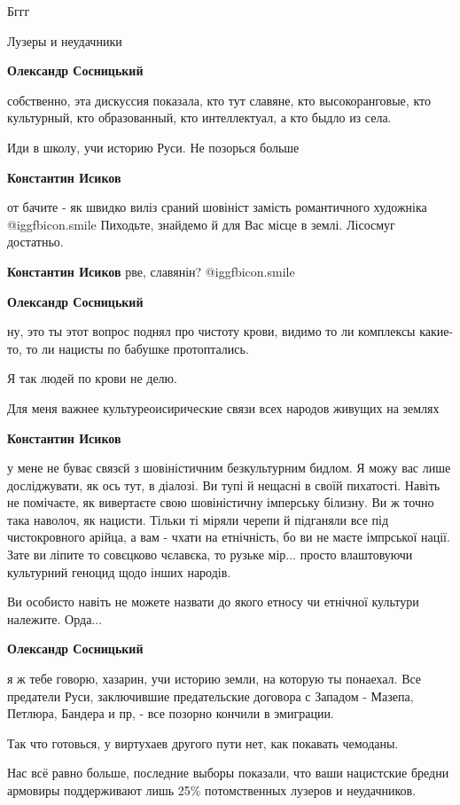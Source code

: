 \begin{itemize}
\begin{itemize}
Бггг

Лузеры и неудачники

\textbf{Олександр Сосницький} 

собственно, эта дискуссия показала, кто тут славяне, кто высокоранговые, кто
культурный, кто образованный, кто интеллектуал, а кто быдло из села.

Иди в школу, учи историю Руси.
Не позорься больше

\textbf{Константин Исиков} 

от бачите - як швидко виліз сраний шовініст замість романтичного художніка
@igg{fbicon.smile}  Пиходьте, знайдемо й для Вас місце в землі. Лісосмуг
достатньо.

\textbf{Константин Исиков} рве, славянін?  @igg{fbicon.smile} 

\textbf{Олександр Сосницький} 

ну, это ты этот вопрос поднял про чистоту крови, видимо то ли комплексы
какие-то, то ли нацисты по бабушке протоптались.

Я так людей по крови не делю.

Для меня важнее культуреоисирические связи всех народов живущих на землях

\textbf{Константин Исиков} 

у мене не буває связєй з шовіністичним безкультурним бидлом. Я можу вас лише
досліджувати, як ось тут, в діалозі. Ви тупі й нещасні в своїй пихатості.
Навіть не помічаєте, як вивертаєте свою шовіністичну імперську білизну. Ви ж
точно така наволоч, як нацисти. Тільки ті міряли черепи й підганяли все під
чистокровного арійца, а вам - чхати на етнічність, бо ви не маєте імпрської
нації. Зате ви ліпите то совєцково чєлавєка, то рузьке мір... просто влаштовуючи
культурний геноцид щодо інших народів.

Ви особисто навіть не можете назвати до якого етносу чи етнічної культури
належите. Орда...


\textbf{Олександр Сосницький} 

я ж тебе говорю, хазарин, учи историю земли, на которую ты понаехал. Все
предатели Руси, заключившие предательские договора с Западом - Мазепа, Петлюра,
Бандера и пр, - все позорно кончили в эмиграции.

Так что готовься, у виртухаев другого пути нет, как покавать чемоданы.

Нас всё равно больше, последние выборы показали, что ваши нацистские бредни
армовиры поддерживают лишь 25\% потомственных лузеров и неудачников.


\end{itemize}
\end{itemize}
